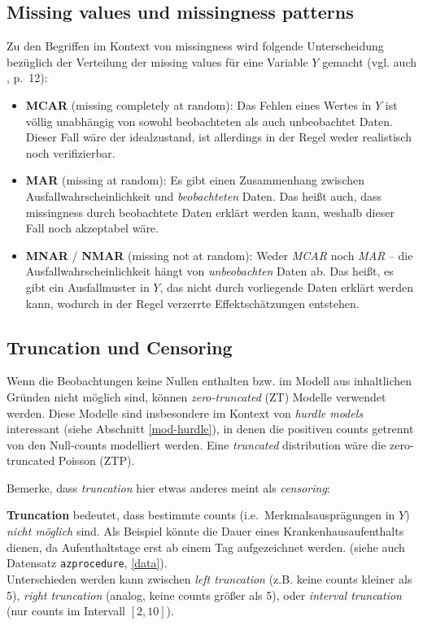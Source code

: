 \documentclass[ngerman,a4paper,]{scrartcl}
\providecommand{\tightlist}{%
  \setlength{\itemsep}{0pt}\setlength{\parskip}{0pt}}
\theoremstyle{definition}
\theoremstyle{definition}
\theoremstyle{definition}
\theoremstyle{remark}
\begin{document}
\hypertarget{appendix-missingness}{%
\subsection{Missing values und missingness patterns}\label{appendix-missingness}}

Zu den Begriffen im Kontext von missingness wird folgende Unterscheidung bezüglich der Verteilung der missing values für eine Variable \(Y\) gemacht (vgl. auch \citet{littleStatisticalAnalysisMissing2002}, p.~12):

\begin{itemize}
\tightlist
\item
  \textbf{MCAR} (missing completely at random): Das Fehlen eines Wertes in \(Y\) ist völlig unabhängig von sowohl beobachteten als auch unbeobachtet Daten. Dieser Fall wäre der idealzustand, ist allerdings in der Regel weder realistisch noch verifizierbar.
\item
  \textbf{MAR} (missing at random): Es gibt einen Zusammenhang zwischen Ausfallwahrscheinlichkeit und \emph{beobachteten} Daten. Das heißt auch, dass missingness durch beobachtete Daten erklärt werden kann, weshalb dieser Fall noch akzeptabel wäre.
\item
  \textbf{MNAR} / \textbf{NMAR} (missing not at random): Weder \emph{MCAR} noch \emph{MAR} -- die Ausfallwahrscheinlichkeit hängt von \emph{unbeobachten} Daten ab. Das heißt, es gibt ein Ausfallmuster in \(Y\), das nicht durch vorliegende Daten erklärt werden kann, wodurch in der Regel verzerrte Effektschätzungen entstehen.
\end{itemize}

\hypertarget{trunc-cens}{%
\subsection{Truncation und Censoring}\label{trunc-cens}}

Wenn die Beobachtungen keine Nullen enthalten bzw. im Modell aus inhaltlichen Gründen nicht möglich sind, können \emph{zero-truncated} (ZT) Modelle verwendet werden. Diese Modelle sind insbesondere im Kontext von \emph{hurdle models} interessant (siehe Abschnitt \ref{mod-hurdle}), in denen die positiven counts getrennt von den Null-counts modelliert werden. Eine \emph{truncated} distribution wäre die zero-truncated Poisson (ZTP).

Bemerke, dass \emph{truncation} hier etwas anderes meint als \emph{censoring}:

\textbf{Truncation} bedeutet, dass bestimmte counts (i.e.~Merkmalsausprägungen in \(Y\)) \emph{nicht möglich} sind. Als Beispiel könnte die Dauer eines Krankenhausaufenthalts dienen, da Aufenthaltstage erst ab einem Tag aufgezeichnet werden. (siehe auch Datensatz \texttt{azprocedure}, \ref{data}).\\
Unterschieden werden kann zwischen \emph{left truncation} (z.B. keine counts kleiner als 5), \emph{right truncation} (analog, keine counts größer als 5), oder \emph{interval truncation} (nur counts im Intervall \([2, 10]\)).
\end{document}
